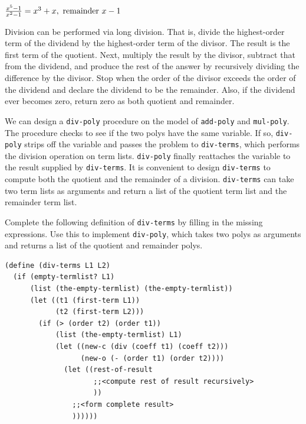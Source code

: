 \documentclass[final,fleqn,titlepage,twoside]{article}
\begin{document}
\(\frac{x^5 - 1}{x^2 - 1} = x^3 + x, \hbox{  remainder  } x - 1\)

Division can be performed via long division.  That is, divide the highest-order
term of the dividend by the highest-order term of the divisor.  The result is
the first term of the quotient.  Next, multiply the result by the divisor,
subtract that from the dividend, and produce the rest of the answer by
recursively dividing the difference by the divisor.  Stop when the order of the
divisor exceeds the order of the dividend and declare the dividend to be the
remainder.  Also, if the dividend ever becomes zero, return zero as both
quotient and remainder.

We can design a \texttt{div-poly} procedure on the model of
\texttt{add-poly} and \texttt{mul-poly}. The procedure checks to see if
the two polys have the same variable. If so, \texttt{div-poly} strips off the
variable and passes the problem to \texttt{div-terms}, which performs the
division operation on term lists. \texttt{div-poly} finally reattaches the
variable to the result supplied by \texttt{div-terms}. It is convenient to
design \texttt{div-terms} to compute both the quotient and the remainder of a
division. \texttt{div-terms} can take two term lists as arguments and return
a list of the quotient term list and the remainder term list.

Complete the following definition of \texttt{div-terms} by filling in the
missing expressions. Use this to implement \texttt{div-poly}, which takes two
polys as arguments and returns a list of the quotient and remainder polys.

\begin{verbatim}
(define (div-terms L1 L2)
  (if (empty-termlist? L1)
      (list (the-empty-termlist) (the-empty-termlist))
      (let ((t1 (first-term L1))
            (t2 (first-term L2)))
        (if (> (order t2) (order t1))
            (list (the-empty-termlist) L1)
            (let ((new-c (div (coeff t1) (coeff t2)))
                  (new-o (- (order t1) (order t2))))
              (let ((rest-of-result
                     ;;<compute rest of result recursively>
                     ))
                ;;<form complete result>
                ))))))
\end{verbatim}
\end{document}
